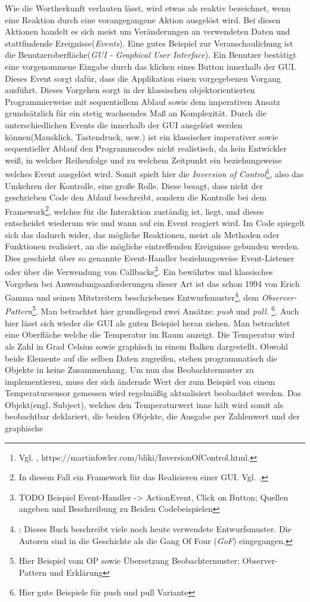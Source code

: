 Wie die Wortherkunft verlauten lässt, wird etwas als reaktiv bezeichnet, wenn eine Reaktion durch eine vorangegangene Aktion ausgelöst wird. Bei diesen Aktionen handelt es sich meist um Veränderungen an verwendeten Daten und stattfindende Ereignisse(\textit{Events}). Eine gutes Beispiel zur Veranschaulichung ist die Benutzeroberfläche(\textit{GUI - Graphical User Interface}). Ein Benutzer bestätigt eine vorgenommene Eingabe durch das klicken eines Button innerhalb der GUI. Dieses Event sorgt dafür, dass die Applikation einen vorgegebenen Vorgang ausführt. Dieses Vorgehen sorgt in der klassischen objektorientierten Programmierweise mit sequentiellem Ablauf sowie dem imperativen Ansatz grundsätzlich für ein stetig wachsendes Maß an Komplexität. Durch die unterschiedlichen Events die innerhalb der GUI ausgelöst werden können(Mausklick, Tastendruck, usw.) ist ein klassischer imperativer sowie sequentieller Ablauf den Programmcodes nicht realistisch, da kein Entwickler weiß, in welcher Reihenfolge und zu welchem Zeitpunkt ein beziehungsweise welches Event ausgelöst wird. Somit spielt hier die \textit{Inversion of Control}\footnote{Vgl. \cite{MartinFowler.2005}, https://martinfowler.com/bliki/InversionOfControl.html.}, also das Umkehren der Kontrolle, eine große Rolle. Diese besagt, dass nicht der geschrieben Code den Ablauf beschreibt, sondern die Kontrolle bei dem Framework\footnote{In diesem Fall ein Framework für das Realisieren einer GUI. Vgl. \cite{wiki.guilist}.}, welches für die Interaktion zuständig ist, liegt, und dieses entscheidet wiederum wie und wann auf ein Event reagiert wird. Im Code spiegelt sich das dadurch wider, das mögliche Reaktionen, meist als Methoden oder Funktionen realisiert, an die mögliche eintreffenden Ereignisse gebunden werden. Dies geschieht über so genannte Event-Handler beziehungsweise Event-Listener oder über die Verwendung von Callbacks\footnote{TODO Beispiel Event-Handler -> ActionEvent, Click on Button; Quellen angeben und Beschreibung zu Beiden Codebeispielen}. Ein bewährtes und klassisches Vorgehen bei Anwendungsanforderungen dieser Art ist das schon 1994 von Erich Gamma und seinen Mitstreitern beschriebenes Entwurfsmuster\footnote{\cite{Gamma.2011}: Dieses Buch beschreibt viele noch heute verwendete Entwurfsmuster. Die Autoren sind in die Geschichte als die Gang Of Four (\textit{GoF}) eingegangen.}, dem \textit{Observer-Pattern}\footnote{Hier Beispiel vom OP sowie Übersetzung Beobachtermuster; Observer-Pattern und Erklärung}. Man betrachtet hier grundlegend zwei Ansätze: \textit{push}  und \textit{pull}. \footnote{Hier gute Beispiele für push und pull Variante}. Auch hier lässt sich wieder die GUI als guten Beispiel heran ziehen. Man betrachtet eine Oberfläche welche die Temperatur im Raum anzeigt. Die Temperatur wird als Zahl in Grad Celsius sowie graphisch in einem Balken dargestellt. Obwohl beide Elemente auf die selben Daten zugreifen, stehen programmatisch die Objekte in keine Zusammenhang. Um nun das Beobachtermuster zu implementieren, muss der sich ändernde Wert der zum Beispiel von einem Temperatursensor gemessen wird regelmäßig aktualisiert beobachtet werden. Das Objekt(engl. Subject), welches den Temperaturwert inne hält wird somit als beobachtbar deklariert, die beiden Objekte, die Ausgabe per Zahlenwert und der graphische 